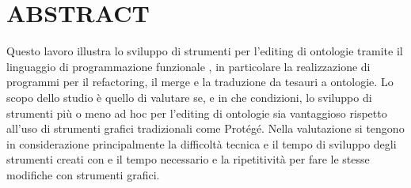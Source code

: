 \chapter*{ABSTRACT}
\vspace{1cm}
Questo lavoro illustra lo sviluppo di strumenti per l’editing di ontologie tramite il linguaggio di programmazione funzionale \cduce, in particolare la realizzazione di programmi per il refactoring, il merge e la traduzione da tesauri a ontologie. Lo scopo dello studio è quello di valutare se, e in che condizioni, lo sviluppo di strumenti più o meno ad hoc per l’editing di ontologie sia vantaggioso rispetto all’uso di strumenti grafici tradizionali come Protégé. Nella valutazione si tengono in considerazione principalmente la difficoltà tecnica e il tempo di sviluppo degli strumenti creati con \cduce e il tempo necessario e la ripetitività per fare le stesse modifiche con strumenti grafici.